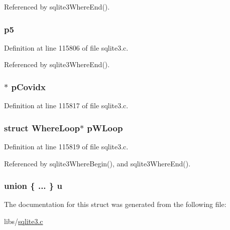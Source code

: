 Referenced by sqlite3\+Where\+End().

\hypertarget{struct_where_level_a8308037057f2acf587d898607ed08fd6}{}
\subsubsection[{p5}]{ p5}\label{struct_where_level_a8308037057f2acf587d898607ed08fd6}


Definition at line 115806 of file sqlite3.\+c.



Referenced by sqlite3\+Where\+End().

\hypertarget{struct_where_level_ad38e62acb47a76c40ab4fcbcfdb0ce18}{}
\subsubsection[{p\+Covidx}]{$\ast$ p\+Covidx}\label{struct_where_level_ad38e62acb47a76c40ab4fcbcfdb0ce18}


Definition at line 115817 of file sqlite3.\+c.

\hypertarget{struct_where_level_a2e21955e3f7fb01607e9b12a7d2101a0}{}
\subsubsection[{p\+W\+Loop}]{\setlength{\rightskip}{0pt plus 5cm}struct {\bf Where\+Loop}$\ast$ p\+W\+Loop}\label{struct_where_level_a2e21955e3f7fb01607e9b12a7d2101a0}


Definition at line 115819 of file sqlite3.\+c.



Referenced by sqlite3\+Where\+Begin(), and sqlite3\+Where\+End().

\hypertarget{struct_where_level_a97b2ee0306e1c3cf789e790a1f64befa}{}
\subsubsection[{u}]{\setlength{\rightskip}{0pt plus 5cm}union \{ ... \}   u}\label{struct_where_level_a97b2ee0306e1c3cf789e790a1f64befa}


The documentation for this struct was generated from the following file\+:\begin{DoxyCompactItemize}
\item 
libs/\hyperlink{sqlite3_8c}{sqlite3.\+c}\end{DoxyCompactItemize}
